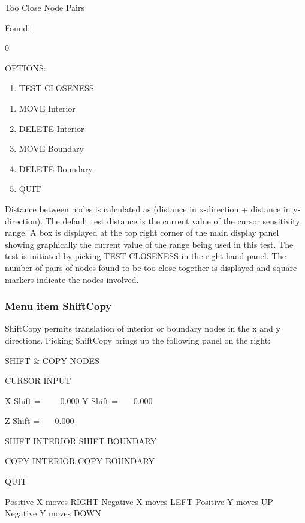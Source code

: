 \documentclass{article}
\begin{document}
Too Close Node Pairs

Found:

0

OPTIONS:

\begin{enumerate}
\item TEST CLOSENESS
\end{enumerate}

\bigskip

\begin{enumerate}
\item MOVE Interior
\item DELETE Interior
\item MOVE Boundary
\item DELETE Boundary
\item QUIT
\end{enumerate}
Distance between nodes is calculated as (distance in x-direction + distance in y-direction). The default test distance is the current value of the cursor sensitivity range. A box is displayed at the top right corner of the main display panel showing graphically the current value of the range being used in this test. The test is initiated by picking TEST CLOSENESS in the right-hand panel. The number of pairs of nodes found to be too close together is displayed and square markers indicate the nodes involved. 

\subsubsection[Menu item ShiftCopy]{Menu item ShiftCopy}
ShiftCopy permits translation of interior or boundary nodes in the x and y directions. Picking ShiftCopy brings up the following panel on the right:

SHIFT \& COPY NODES

CURSOR INPUT


\bigskip

X Shift = \ \ \ \ 0.000\newline
Y Shift = \ \ \ 0.000

Z Shift = \ \ \ 0.000


\bigskip

SHIFT INTERIOR\newline
SHIFT BOUNDARY

COPY INTERIOR\newline
COPY BOUNDARY

QUIT

Positive X moves RIGHT\newline
Negative X moves LEFT\newline
Positive Y moves UP\newline
Negative Y moves DOWN
\end{document}
